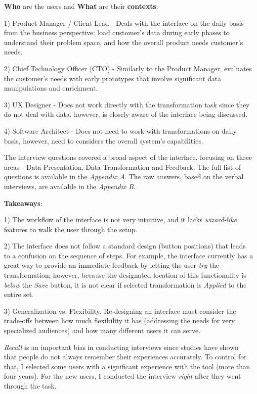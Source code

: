\documentclass[12pt,letterpaper]{article}
\begin{document}
\textbf{Who} are the users and \textbf{What} are their \textbf{contexts}:

1) Product Manager / Client Lead - Deals with the interface on the daily basis from the business perspective: load customer's data during early phases to understand their problem space, and how the overall product needs customer's needs.

2) Chief Technology Officer (CTO) - Similarly to the Product Manager, evaluates the customer's needs with early prototypes that involve significant data manipulations and enrichment.

3) UX Designer - Does not work directly with the transformation task since they do not deal with data, however, is closely aware of the interface being discussed.   

4) Software Architect - Does not need to work with transformations on daily basis, however, need to considers the overall system's capabilities.

The interview questions covered a broad aspect of the interface, focusing on three areas - Data Presentation, Data Transformation and Feedback. The full list of questions is available in the \textit{Appendix A}. The raw answers, based on the verbal interviews, are available in the \textit{Appendix B}. 

\textbf{Takeaways}:

1) The workflow of the interface is not very intuitive, and it lacks \textit{wizard-like} features to walk the user through the setup.

2) The interface does not follow a standard design (button positions) that leads to a confusion on the sequence of steps. For example, the interface currently has a great way to provide an immediate feedback by letting the user \textit{try} the transformation; however, because the designated location of this functionality is \textit{below} the \textit{Save} button, it is not clear if selected transformation is \textit{Applied} to the entire set.

3) Generalization vs. Flexibility. Re-designing an interface must consider the trade-offs between how much flexibility it has (addressing the needs for very specialized audiences) and how many different users it can serve.

\textit{Recall} is an important bias in conducting interviews since studies have shown that people do not always remember their experiences accurately. To control for that, I selected some users with a significant experience with the tool (more than four years). For the new users, I conducted the interview \textit{right} after they went through the task.  
\end{document}

